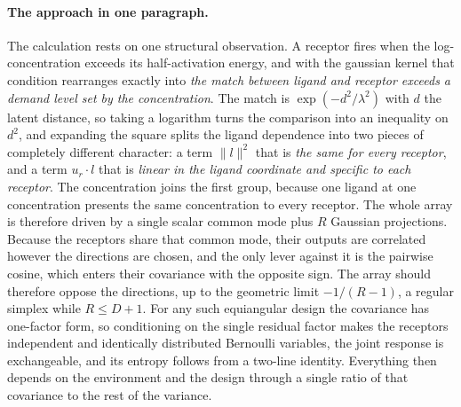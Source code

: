 \documentclass[11pt,a4paper]{article}
\begin{document}
\paragraph{The approach in one paragraph.}
The calculation rests on one structural observation. A receptor fires when the
log-concentration exceeds its half-activation energy, and with the gaussian kernel that
condition rearranges exactly into \emph{the match between ligand and receptor exceeds a
demand level set by the concentration}. The match is $\exp(-d^2/\lambda^2)$ with $d$ the
latent distance, so taking a logarithm turns the comparison into an inequality on $d^2$,
and expanding the square splits the ligand dependence into two pieces of completely
different character: a term $\|l\|^2$ that is \emph{the same for every receptor}, and a
term $u_r\cdot l$ that is \emph{linear in the ligand coordinate and specific to each
receptor}. The concentration joins the first group, because one ligand at one
concentration presents the same concentration to every receptor. The whole array is
therefore driven by a single scalar common mode plus $R$ Gaussian projections. Because the
receptors share that common mode, their outputs are correlated however the directions are
chosen, and the only lever against it is the pairwise cosine, which enters their
covariance with the opposite sign. The array should therefore oppose the directions, up to
the geometric limit $-1/(R-1)$, a regular simplex while $R\le D+1$. For any such
equiangular design the covariance has one-factor form, so
conditioning on the single residual factor makes the receptors independent and identically
distributed Bernoulli variables, the joint response is exchangeable, and its entropy
follows from a two-line identity. Everything then depends on the environment and the design
through a single ratio of that covariance to the rest of the variance.
\end{document}
